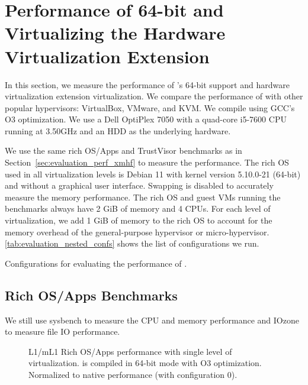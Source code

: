 \section{Performance of 64-bit and Virtualizing the Hardware Virtualization Extension}
\label{sec:evaluation_perf_nested}

In this section, we measure the performance of 's 64-bit support and hardware virtualization extension virtualization. We compare the performance of  with other popular hypervisors: VirtualBox, VMware, and KVM. We compile  using GCC's O3 optimization. We use a Dell OptiPlex 7050 with a quad-core i5-7600 CPU running at 3.50GHz and an HDD as the underlying hardware.

We use the same rich OS/Apps and TrustVisor benchmarks as in Section~\ref{sec:evaluation_perf_xmhf} to measure the performance. The rich OS used in all virtualization levels is Debian 11 with kernel version 5.10.0-21 (64-bit) and without a graphical user interface. Swapping is disabled to accurately measure the memory performance. The rich OS and guest VMs running the benchmarks always have 2 GiB of memory and 4 CPUs. For each level of virtualization, we add 1 GiB of memory to the rich OS to account for the memory overhead of the general-purpose hypervisor or micro-hypervisor. \ref{tab:evaluation_nested_confs} shows the list of configurations we run.

\begin{table}[tbp]
	\begin{center}
	
	\caption{Configurations for evaluating the performance of .}
	\label{tab:evaluation_nested_confs}
	\end{center}
\end{table}

\subsection{Rich OS/Apps Benchmarks}

We still use sysbench \cite{kopytov2020sysbench} to measure the CPU and memory performance and IOzone \cite{norcott2003iozone} to measure file IO performance.

\begin{figure}[tbp]
	\begin{center}
	
	\end{center}
	\caption[L1/mL1 Rich OS/Apps performance with single level of virtualization, normalized to native performance.]{L1/mL1 Rich OS/Apps performance with single level of virtualization.  is compiled in 64-bit mode with O3 optimization. Normalized to native performance (with configuration 0).}
	\label{fig:sysbench_nested_01}
\end{figure}

